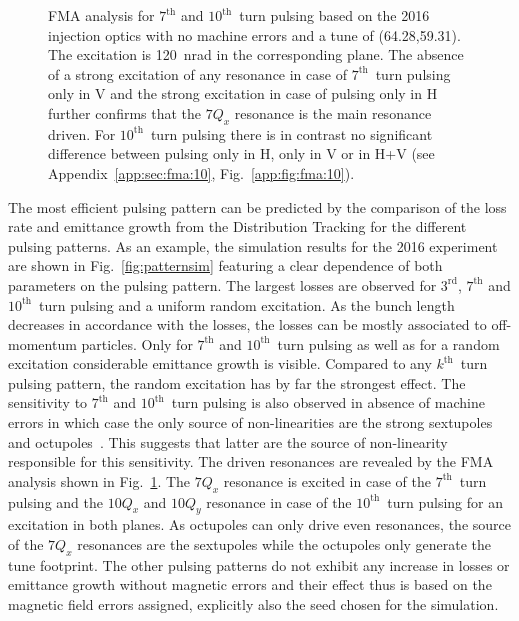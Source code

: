 \documentclass[%
 reprint,
 amsmath,amssymb,
 aps,
prstab,
]{revtex4-1}
\begin{document}
\begin{figure}[h]
\begin{minipage}[t]{0.49\linewidth}
	\end{minipage}
	\caption{\label{fig:patternfma} FMA analysis for $7^{\mathrm{th}}$ and $10^{\mathrm{th}}$~turn pulsing based on the 2016 injection optics with no machine errors and a tune of (64.28,59.31). The excitation is 120~nrad in the corresponding plane. The absence of a strong excitation of any resonance in case of $7^{\mathrm{th}}$~turn pulsing only in V and the strong excitation in case of pulsing only in H further confirms that the $7Q_x$ resonance is the main resonance driven. For $10^{\mathrm{th}}$~turn pulsing there is in contrast no significant difference between pulsing only in H, only in V or in H+V (see Appendix~\ref{app:sec:fma:10}, Fig.~\ref{app:fig:fma:10}).}
\end{figure}  
The most efficient pulsing pattern can be predicted by the comparison of the loss rate and emittance growth from the Distribution Tracking for the different pulsing patterns. As an example, the simulation results for the 2016 experiment are shown in Fig.~\ref{fig:patternsim} featuring a clear dependence of both parameters on the pulsing pattern. The largest losses are observed for $3^{\mathrm{rd}}$, $7^{\mathrm{th}}$ and $10^{\mathrm{th}}$~turn pulsing and a uniform random excitation. As the bunch length decreases in accordance with the losses, the losses can be mostly associated to off-momentum particles. Only for $7^{\mathrm{th}}$ and $10^{\mathrm{th}}$~turn pulsing as well as for a random excitation considerable emittance growth is visible. Compared to any $k^{\mathrm{th}}$~turn pulsing pattern, the random excitation has by far the strongest effect. The sensitivity to $7^{\mathrm{th}}$ and $10^{\mathrm{th}}$~turn pulsing is also observed in absence of machine errors in which case the only source of non-linearities are the strong sextupoles and octupoles~\cite{md_sim_hel_res_ex_fitterer}. This suggests that latter are the source of non-linearity responsible for this sensitivity. The driven resonances are revealed by the FMA analysis shown in Fig.~\ref{fig:patternfma}. The $7Q_x$ resonance is excited in case of the $7^{\mathrm{th}}$~turn pulsing and the $10Q_x$ and $10Q_y$ resonance in case of the $10^{\mathrm{th}}$~turn pulsing for an excitation in both planes. As octupoles can only drive even resonances, the source of the $7Q_x$ resonances are the sextupoles while the octupoles only generate the tune footprint. The other pulsing patterns do not exhibit any increase in losses or emittance growth without magnetic errors and their effect thus is based on the magnetic field errors assigned, explicitly also the seed chosen for the simulation.
\end{document}
